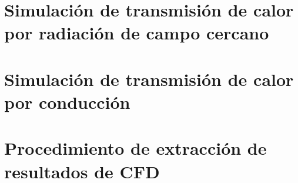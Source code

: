 \section{Simulación de transmisión de calor por radiación de campo cercano}

\section{Simulación de transmisión de calor por conducción}

\section{Procedimiento de extracción de resultados de CFD}